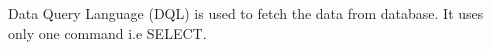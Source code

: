 
\begin{flushleft}
	
	Data Query Language (DQL) is used to fetch the data from database. It uses only one command i.e SELECT.
	
\end{flushleft}

